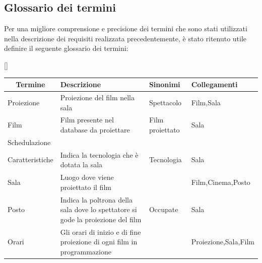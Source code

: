 \documentclass[12pt,a4paper]{book}
\begin{document}
	\subsection{Glossario dei termini}
	Per una migliore comprensione e precisione dei termini che sono stati utilizzati nella descrizione dei requisiti realizzata precedentemente, è stato ritenuto utile definire il seguente glossario dei termini:
	\begin{center}[]
		\begin{tabular}{l | p{5cm} | l | l | l |}
		\hline
		\multicolumn{1}{|c|}{\textbf{Termine}} & \textbf{Descrizione}                                                            & \textbf{Sinonimi} & \multicolumn{2}{l|}{\textbf{Collegamenti}} \\ \hline
		Proiezione                             & Proiezione del film nella sala                                                  & Spettacolo        & \multicolumn{2}{l|}{Film,Sala}             \\ \hline
		Film                                   & Film presente nel database da proiettare                                        & Film proiettato   & \multicolumn{2}{l|}{Sala}                  \\ \hline
		Schedulazione                          &                                                                                 &                   & \multicolumn{2}{l|}{}                      \\ \hline
		Caratteristiche                        & Indica la tecnologia che è dotata la sala                                       & Tecnologia        & \multicolumn{2}{l|}{Sala}                  \\ \hline
		Sala                                   & Luogo dove viene proiettato il film                                             &                   & \multicolumn{2}{l|}{Film,Cinema,Posto}     \\ \hline
		Posto                                  & Indica la poltrona della sala dove lo spettatore si gode la proiezione del film & Occupate          & \multicolumn{2}{l|}{Sala}                  \\ \hline
		Orari                                  & Gli orari di inizio e di fine proiezione di ogni film in programmazione         &                   & \multicolumn{2}{l|}{Proiezione,Sala,Film}  \\ \hline  
		\end{tabular}
	\end{center}
\end{document}
